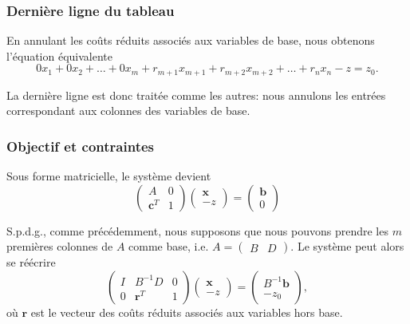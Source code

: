 \documentclass[t,usepdftitle=false]{beamer}
\def\bb{\boldsymbol{b}}
\def\bc{\boldsymbol{c}}
\def\br{\boldsymbol{r}}
\def\bx{\boldsymbol{x}}
\begin{document}
\begin{frame}
\frametitle{Dernière ligne du tableau}

En annulant les coûts réduits associés aux variables de base, nous obtenons l'équation équivalente
$$
0x_1 + 0x_2 + \ldots + 0x_m + r_{m+1}x_{m+1} + r_{m+2}x_{m+2} + \ldots + r_nx_n - z = z_0.
$$	
	
\mbox{}
	
La dernière ligne est donc traitée comme les autres: nous annulons les entrées correspondant aux colonnes des variables de base.

\end{frame}

\begin{frame}
\frametitle{Objectif et contraintes}

Sous forme matricielle, le système devient
$$
\begin{pmatrix}
	A & 0 \\
	\bc^T & 1 
\end{pmatrix}
\begin{pmatrix}
	\bx \\
	-z 
\end{pmatrix}
=
\begin{pmatrix}
	\bb \\
	0
\end{pmatrix}
$$

S.p.d.g., comme précédemment, nous supposons que nous pouvons prendre les $m$ premières colonnes de $A$ comme base, i.e. $ A = \begin{pmatrix}
	B & D
\end{pmatrix}.$ Le système peut alors se réécrire
$$
\begin{pmatrix}
	I & B^{-1}D & 0 \\
	0 & \br^T & 1 
\end{pmatrix}
\begin{pmatrix}
	\bx \\
	-z 
\end{pmatrix}
=
\begin{pmatrix}
	B^{-1}\bb \\
	 -z_0
\end{pmatrix},
$$
où $\br$ est le vecteur des coûts réduits associés aux variables hors base.

\end{frame}
\end{document}
